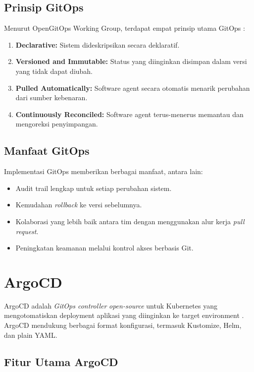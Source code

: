 \subsection{Prinsip GitOps}

Menurut OpenGitOps Working Group, terdapat empat prinsip utama GitOps \citep{gitops-principles}:

\begin{enumerate}
    \item \textbf{Declarative:} Sistem dideskripsikan secara deklaratif.
    \item \textbf{Versioned and Immutable:} Status yang diinginkan disimpan dalam versi yang tidak dapat diubah.
    \item \textbf{Pulled Automatically:} Software agent secara otomatis menarik perubahan dari sumber kebenaran.
    \item \textbf{Continuously Reconciled:} Software agent terus-menerus memantau dan mengoreksi penyimpangan.
\end{enumerate}

\subsection{Manfaat GitOps}

Implementasi GitOps memberikan berbagai manfaat, antara lain:

\begin{itemize}
    \item Audit trail lengkap untuk setiap perubahan sistem.
    \item Kemudahan \textit{rollback} ke versi sebelumnya.
    \item Kolaborasi yang lebih baik antara tim dengan menggunakan alur kerja \textit{pull request}.
    \item Peningkatan keamanan melalui kontrol akses berbasis Git.
\end{itemize}

\section{ArgoCD}

ArgoCD adalah \textit{GitOps controller} \textit{open-source} untuk Kubernetes yang mengotomatiskan deployment aplikasi yang diinginkan ke target environment \citep{argocd-docs}. ArgoCD mendukung berbagai format konfigurasi, termasuk Kustomize, Helm, dan plain YAML.

\subsection{Fitur Utama ArgoCD}

